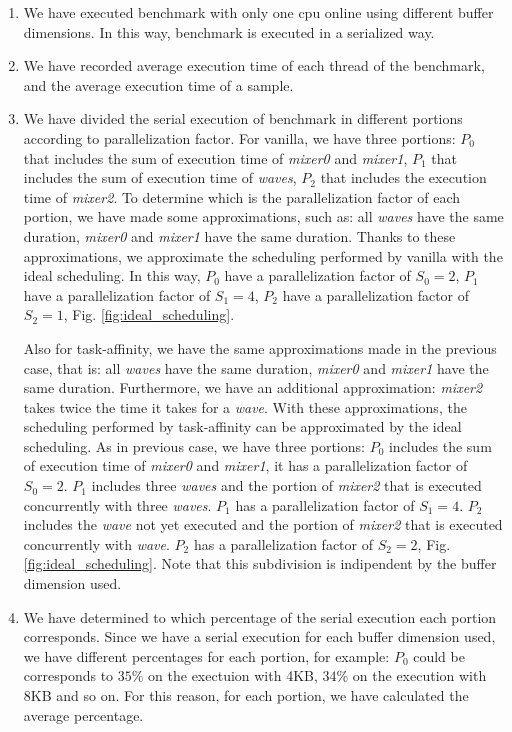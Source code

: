 \begin{enumerate}
\item We have executed benchmark with only one cpu online using different buffer dimensions. In this way, benchmark is executed in a serialized way.
\item We have recorded average execution time of each thread of the benchmark, and the average execution time of a sample.
\item We have divided the serial execution of benchmark in different portions according to parallelization factor. For vanilla, we have three portions: 
$P_{0}$ that includes the sum of execution time of \textit{mixer0} and \textit{mixer1}, $P_{1}$ that includes the sum of execution time of \textit{waves}, 
$P_{2}$ that includes the execution time of \textit{mixer2}. To determine which is the parallelization factor of each portion, we have made some 
approximations, such as: all \textit{waves} have the same duration, \textit{mixer0} and \textit{mixer1} have the same duration. Thanks to these 
approximations, we approximate the scheduling performed by vanilla with the ideal scheduling. In this way, $P_{0}$ have a parallelization factor of 
$S_{0} = 2$, $P_{1}$ have a parallelization factor of $S_{1} = 4$, $P_{2}$ have a parallelization factor of $S_{2} = 1$, Fig. \ref{fig:ideal_scheduling}.

Also for task-affinity, we have the same approximations made in the previous case, that is: all \textit{waves} have the same duration, \textit{mixer0} and 
\textit{mixer1} have the same duration. Furthermore, we have an additional approximation: \textit{mixer2} takes twice the time it takes for a \textit{wave}. 
With these approximations, the scheduling performed by task-affinity can be approximated by the ideal scheduling. As in previous case, we have three 
portions: $P_{0}$ includes the sum of execution time of \textit{mixer0} and \textit{mixer1}, it has a parallelization factor of $S_{0} = 2$. $P_{1}$ 
includes three \textit{waves} and the portion of \textit{mixer2} that is executed concurrently with three \textit{waves}. $P_{1}$ has a parallelization 
factor of $S_{1} = 4$. $P_{2}$ includes the \textit{wave} not yet executed and the portion of \textit{mixer2} that is executed concurrently with 
\textit{wave}. $P_{2}$ has a parallelization factor of $S_{2} = 2$, Fig. \ref{fig:ideal_scheduling}. Note that this subdivision is indipendent by the 
buffer dimension used.

\item We have determined to which percentage of the serial execution each portion corresponds. Since we have a serial execution for each buffer dimension 
used, we have different percentages for each portion, for example: $P_{0}$ could be corresponds to $35\%$ on the exectuion with 4KB, $34\%$ on the execution 
with 8KB and so on. For this reason, for each portion, we have calculated the average percentage.

\end{enumerate}
